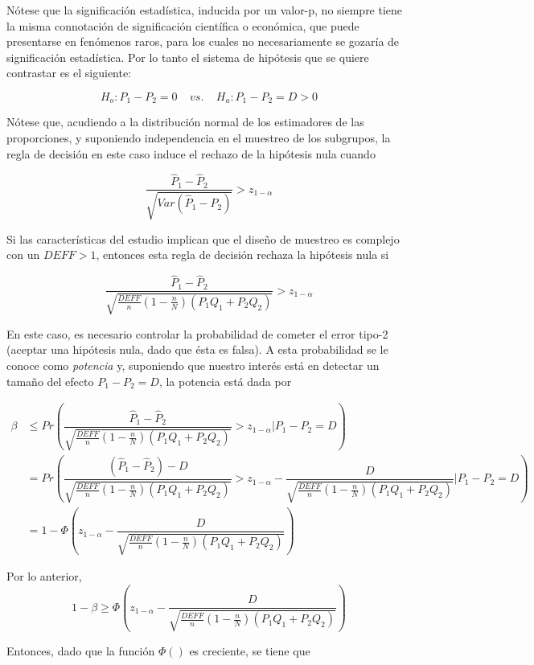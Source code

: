 \documentclass[
  12pt,
]{book}
\begin{document}
Nótese que la significación estadística, inducida por un valor-p, no siempre tiene la misma connotación de significación científica o económica, que puede presentarse en fenómenos raros, para los cuales no necesariamente se gozaría de significación estadística. Por lo tanto el sistema de hipótesis que se quiere contrastar es el siguiente:

\[
H_o: P_1-P_2=0 \ \ \ \ \ vs.  \ \ \ \ \ H_a: P_1 -P_2 =D > 0 
\]

Nótese que, acudiendo a la distribución normal de los estimadores de las proporciones, y suponiendo independencia en el muestreo de los subgrupos, la regla de decisión en este caso induce el rechazo de la hipótesis nula cuando

\[
\dfrac{\hat{P}_1-\hat{P}_2}{\sqrt{Var(\hat{P}_1-\hat{P}_2)}} > z_{1-\alpha}
\]

Si las características del estudio implican que el diseño de muestreo es complejo con un \(DEFF > 1\), entonces esta regla de decisión rechaza la hipótesis nula si

\[
\dfrac{\hat{P}_1-\hat{P}_2}{\sqrt{\frac{DEFF}{n}\left(1-\frac{n}{N}\right)(P_1Q_1+P_2Q_2)}} > z_{1-\alpha}
\]

En este caso, es necesario controlar la probabilidad de cometer el error tipo-2 (aceptar una hipótesis nula, dado que ésta es falsa). A esta probabilidad se le conoce como \emph{potencia} y, suponiendo que nuestro interés está en detectar un tamaño del efecto \(P_1 -P_2 =D\), la potencia está dada por

\begin{align*}
\beta &\leq Pr\left(\dfrac{\hat{P}_1-\hat{P}_2}{\sqrt{\frac{DEFF}{n}\left(1-\frac{n}{N}\right)(P_1Q_1+P_2Q_2)}} > z_{1-\alpha} \left. | \right. P_1 -P_2 =D \right)\\
&= Pr\left(\dfrac{(\hat{P}_1-\hat{P}_2)-D}{\sqrt{\frac{DEFF}{n}\left(1-\frac{n}{N}\right)(P_1Q_1+P_2Q_2)}} > z_{1-\alpha} - \dfrac{D}{\sqrt{\frac{DEFF}{n}\left(1-\frac{n}{N}\right)(P_1Q_1+P_2Q_2)}} | P_1 -P_2 =D
\right)\\
&= 1-\Phi\left(z_{1-\alpha} - \dfrac{D}{\sqrt{\frac{DEFF}{n}\left(1-\frac{n}{N}\right)(P_1Q_1+P_2Q_2)}} \right)
\end{align*}

Por lo anterior,
\[
1-\beta \geq \Phi\left(z_{1-\alpha} - \dfrac{D}{\sqrt{\frac{DEFF}{n}\left(1-\frac{n}{N}\right)(P_1Q_1+P_2Q_2)}} \right)
\]

Entonces, dado que la función \(\Phi()\) es creciente, se tiene que
\end{document}

